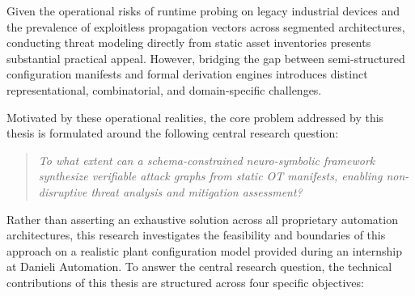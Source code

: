 \documentclass[target=mst,aauheader=aics,style=]{thud}
\begin{document}
Given the operational risks of runtime probing on legacy industrial devices and the prevalence of exploitless propagation vectors across segmented architectures, conducting threat modeling directly from static asset inventories presents substantial practical appeal. However, bridging the gap between semi-structured configuration manifests and formal derivation engines introduces distinct representational, combinatorial, and domain-specific challenges. 

Motivated by these operational realities, the core problem addressed by this thesis is formulated around the following central research question:

\begin{quote}
\textit{To what extent can a schema-constrained neuro-symbolic framework synthesize verifiable attack graphs from static OT manifests, enabling non-disruptive threat analysis and mitigation assessment?}
\end{quote}

Rather than asserting an exhaustive solution across all proprietary automation architectures, this research investigates the feasibility and boundaries of this approach on a realistic plant configuration model provided during an internship at Danieli Automation. To answer the central research question, the technical contributions of this thesis are structured across four specific objectives:
\end{document}

